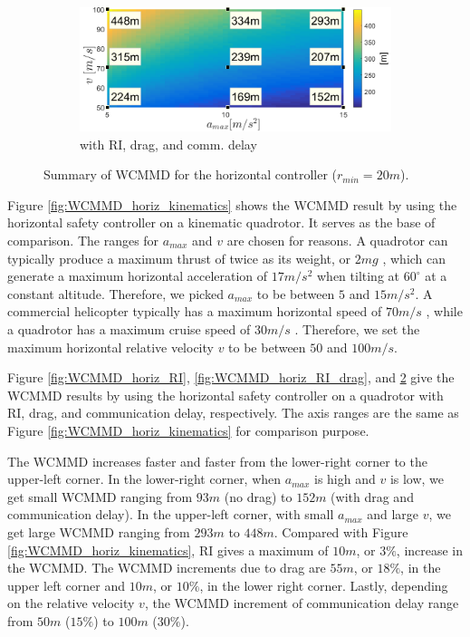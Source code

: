 \documentclass[journal,11pt,onecolumn,draftclsnofoot,]{IEEEtran}
\begin{document}
\begin{figure}
	\hfill
	\begin{subfigure}{.45\columnwidth}\centering
		\includegraphics[width=\columnwidth]{WCMMD_horizontal_RI_drag_delay}
		\caption{with RI, drag, and comm. delay}
		\label{fig:WCMMD_horiz_RI_drag_delay}
	\end{subfigure}%
	\caption{Summary of WCMMD for the horizontal controller ($r_{min}=20m$).}
\end{figure}

Figure \ref{fig:WCMMD_horiz_kinematics} shows the WCMMD result by using the horizontal safety controller on a kinematic quadrotor. It serves as the base of comparison. The ranges for $a_{max}$ and $v$ are chosen for reasons. A quadrotor can typically produce a maximum thrust of twice as its weight, or $2mg$ \cite{quad_design}, which can generate a maximum horizontal acceleration of $17m/s^2$ when tilting at $60^{\circ}$ at a constant altitude. Therefore, we picked $a_{max}$ to be between $5$ and $15m/s^2$. A commercial helicopter typically has a maximum horizontal speed of $70m/s$ \cite{helicopter_common_speed}, while a quadrotor has a maximum cruise speed of $30m/s$ \cite{quadrotor_common_speed}. Therefore, we set the maximum horizontal relative velocity $v$ to be between $50$ and $100m/s$.

Figure \ref{fig:WCMMD_horiz_RI}, \ref{fig:WCMMD_horiz_RI_drag}, and \ref{fig:WCMMD_horiz_RI_drag_delay} give the WCMMD results by using the horizontal safety controller on a quadrotor with RI, drag, and communication delay, respectively. The axis ranges are the same as Figure \ref{fig:WCMMD_horiz_kinematics} for comparison purpose.

The WCMMD increases faster and faster from the lower-right corner to the upper-left corner. In the lower-right corner, when $a_{max}$ is high and $v$ is low, we get small WCMMD ranging from $93 m$ (no drag) to $152 m$ (with drag and communication delay). In the upper-left corner, with small $a_{max}$ and large $v$, we get large WCMMD ranging from $293 m$ to $448 m$. Compared with Figure \ref{fig:WCMMD_horiz_kinematics}, RI gives a maximum of $10 m$, or $3\%$, increase in the WCMMD. The WCMMD increments due to drag are $55 m$, or $18\%$, in the upper left corner and $10 m$, or $10\%$, in the lower right corner. Lastly, depending on the relative velocity $v$, the WCMMD increment of communication delay range from $50 m$ ($15\%$) to $100 m$ ($30\%$).
\end{document}

